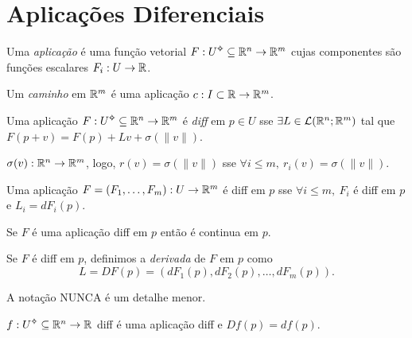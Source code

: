 \section{Aplicações Diferenciais}

\begin{definition}
    Uma \emph{aplicação} é uma função vetorial \(F:U\ab \subseteq \R^n \to \R^m\) cujas componentes são funções escalares \(F_i: U \to \mathbb{R}\).  
\end{definition}
\begin{example}
    Um \emph{caminho} em \(\mathbb{R}^m \) é uma aplicação \(c: I \subset \mathbb{R} \to \mathbb{R}^m\). 
\end{example}
\begin{definition}
    Uma  aplicação \(F:U\ab\subseteq \R^n \to \R^m\) é \emph{diff} em \(p\in U\) sse \(\exists L\in \mathcal{L}(\mathbb{R}^n;\mathbb{R}^m)\) tal que \(F(p+v) = F(p) + Lv + \sigma (\|v\|)\). 
\end{definition}
\begin{note}
    \(\sigma(v): \mathbb{R}^n \to \mathbb{R}^m\), logo, \(r(v) = \sigma(\|v\|)\) sse \(\forall i \leq m, \ r_i(v) = \sigma(\|v\|)\).
\end{note}    
\begin{lemma}
    Uma aplicação \(F = (F_1, \ldots, F_m): U \to \mathbb{R}^m\) é diff em \(p\) sse \(\forall i\leq m,\ F_i\) é diff em \(p\) e \(L_i = dF_i(p)\).  
\end{lemma}

\begin{corollary}
    Se \(F\) é uma aplicação diff em \(p\) então é continua em \(p\). %
\end{corollary}

\begin{definition}
    Se  \(F\) é diff em \(p\), definimos a \emph{derivada} de \(F\) em \(p\) como 
    \[L = DF(p) = (dF_1(p), dF_2(p), \ldots, dF_m(p)).\]
\end{definition}

\begin{note} 
  \vspace{-0.3cm}  A notação NUNCA é um detalhe menor.
\end{note}

\begin{example}
    \(f:U\ab \subseteq \R^n\to \R \) diff é uma aplicação diff e \(Df(p)= df(p)\).  
\end{example}

